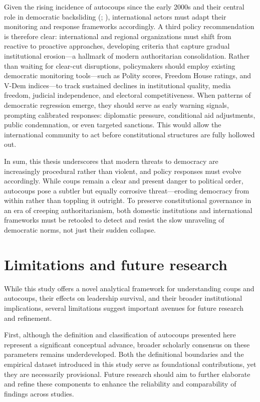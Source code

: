\documentclass[
  12pt,
]{report}
\begin{document}
Given the rising incidence of autocoups since the early 2000s and their
central role in democratic backsliding (; ), international actors must adapt their monitoring and response
frameworks accordingly. A third policy recommendation is therefore
clear: international and regional organizations must shift from reactive
to proactive approaches, developing criteria that capture gradual
institutional erosion---a hallmark of modern authoritarian
consolidation. Rather than waiting for clear-cut disruptions,
policymakers should employ existing democratic monitoring tools---such
as Polity scores, Freedom House ratings, and V-Dem indices---to track
sustained declines in institutional quality, media freedom, judicial
independence, and electoral competitiveness. When patterns of democratic
regression emerge, they should serve as early warning signals, prompting
calibrated responses: diplomatic pressure, conditional aid adjustments,
public condemnation, or even targeted sanctions. This would allow the
international community to act before constitutional structures are
fully hollowed out.

In sum, this thesis underscores that modern threats to democracy are
increasingly procedural rather than violent, and policy responses must
evolve accordingly. While coups remain a clear and present danger to
political order, autocoups pose a subtler but equally corrosive
threat---eroding democracy from within rather than toppling it outright.
To preserve constitutional governance in an era of creeping
authoritarianism, both domestic institutions and international
frameworks must be retooled to detect and resist the slow unraveling of
democratic norms, not just their sudden collapse.

\section{Limitations and future
research}\label{limitations-and-future-research}

While this study offers a novel analytical framework for understanding
coups and autocoups, their effects on leadership survival, and their
broader institutional implications, several limitations suggest
important avenues for future research and refinement.

First, although the definition and classification of autocoups presented
here represent a significant conceptual advance, broader scholarly
consensus on these parameters remains underdeveloped. Both the
definitional boundaries and the empirical dataset introduced in this
study serve as foundational contributions, yet they are necessarily
provisional. Future research should aim to further elaborate and refine
these components to enhance the reliability and comparability of
findings across studies.
\end{document}

